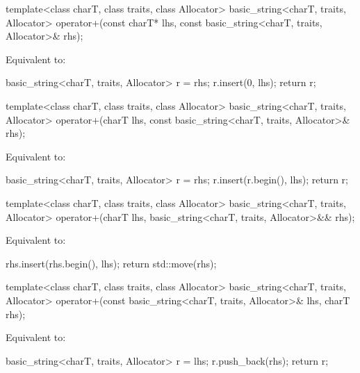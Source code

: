 %
\begin{itemdecl}
template<class charT, class traits, class Allocator>
  basic_string<charT, traits, Allocator>
    operator+(const charT* lhs, const basic_string<charT, traits, Allocator>& rhs);
\end{itemdecl}

\begin{itemdescr}
\pnum
\effects
Equivalent to:
\begin{codeblock}
basic_string<charT, traits, Allocator> r = rhs;
r.insert(0, lhs);
return r;
\end{codeblock}
\end{itemdescr}

%
\begin{itemdecl}
template<class charT, class traits, class Allocator>
  basic_string<charT, traits, Allocator>
    operator+(charT lhs, const basic_string<charT, traits, Allocator>& rhs);
\end{itemdecl}

\begin{itemdescr}
\pnum
\effects
Equivalent to:
\begin{codeblock}
basic_string<charT, traits, Allocator> r = rhs;
r.insert(r.begin(), lhs);
return r;
\end{codeblock}
\end{itemdescr}

%
\begin{itemdecl}
template<class charT, class traits, class Allocator>
  basic_string<charT, traits, Allocator>
    operator+(charT lhs, basic_string<charT, traits, Allocator>&& rhs);
\end{itemdecl}

\begin{itemdescr}
\pnum
\effects
Equivalent to:
\begin{codeblock}
rhs.insert(rhs.begin(), lhs);
return std::move(rhs);
\end{codeblock}
\end{itemdescr}

%
\begin{itemdecl}
template<class charT, class traits, class Allocator>
  basic_string<charT, traits, Allocator>
    operator+(const basic_string<charT, traits, Allocator>& lhs, charT rhs);
\end{itemdecl}

\begin{itemdescr}
\pnum
\effects
Equivalent to:
\begin{codeblock}
basic_string<charT, traits, Allocator> r = lhs;
r.push_back(rhs);
return r;
\end{codeblock}
\end{itemdescr}


